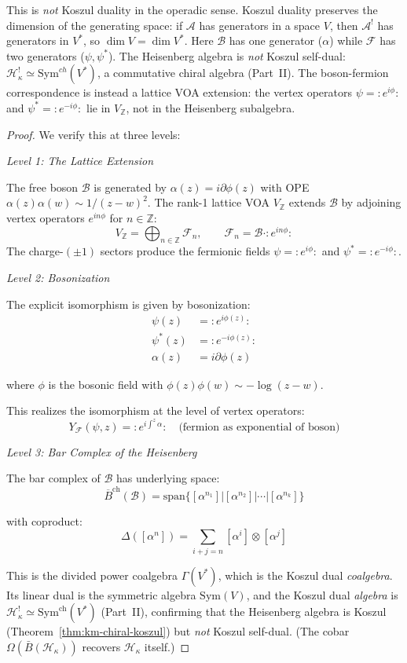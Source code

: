 \begin{remark}
This is \emph{not} Koszul duality in the operadic sense. Koszul duality preserves the dimension of the generating space: if $\mathcal{A}$ has generators in a space $V$, then $\mathcal{A}^!$ has generators in $V^*$, so $\dim V = \dim V^*$. Here $\mathcal{B}$ has one generator ($\alpha$) while $\mathcal{F}$ has two generators ($\psi, \psi^*$). The Heisenberg algebra is \emph{not} Koszul self-dual: $\mathcal{H}_\kappa^! \simeq \mathrm{Sym}^{ch}(V^*)$, a commutative chiral algebra (Part~II). The boson-fermion correspondence is instead a lattice VOA extension: the vertex operators $\psi = {:}e^{i\phi}{:}$ and $\psi^* = {:}e^{-i\phi}{:}$ lie in $V_{\mathbb{Z}}$, not in the Heisenberg subalgebra.
\end{remark}

\begin{proof}
We verify this at three levels:

\emph{Level 1: The Lattice Extension}

The free boson $\mathcal{B}$ is generated by $\alpha(z) = i\partial\phi(z)$ with OPE $\alpha(z)\alpha(w) \sim 1/(z-w)^2$. The rank-1 lattice VOA $V_{\mathbb{Z}}$ extends $\mathcal{B}$ by adjoining vertex operators $e^{in\phi}$ for $n \in \mathbb{Z}$:
\[
V_{\mathbb{Z}} = \bigoplus_{n \in \mathbb{Z}} \mathcal{F}_n, \qquad \mathcal{F}_n = \mathcal{B} \cdot {:}e^{in\phi}{:}
\]
The charge-$(\pm 1)$ sectors produce the fermionic fields $\psi = {:}e^{i\phi}{:}$ and $\psi^* = {:}e^{-i\phi}{:}$.

\emph{Level 2: Bosonization}

The explicit isomorphism is given by bosonization:
\begin{align}
\psi(z) &= :e^{i\phi(z)}: \\
\psi^*(z) &= :e^{-i\phi(z)}: \\
\alpha(z) &= i\partial\phi(z)
\end{align}

where $\phi$ is the bosonic field with $\phi(z)\phi(w) \sim -\log(z-w)$.

This realizes the isomorphism at the level of vertex operators:
\[
Y_{\mathcal{F}}(\psi, z) = :e^{i\int^z \alpha}: \quad \text{(fermion as exponential of boson)}
\]

\emph{Level 3: Bar Complex of the Heisenberg}

The bar complex of $\mathcal{B}$ has underlying space:
\[
\overline{B}^{\text{ch}}(\mathcal{B}) = \text{span}\{[\alpha^{n_1}]|[\alpha^{n_2}]|\cdots|[\alpha^{n_k}]\}
\]

with coproduct:
\[
\Delta([\alpha^n]) = \sum_{i+j=n} [\alpha^i] \otimes [\alpha^j]
\]

This is the divided power coalgebra $\Gamma(V^*)$, which is the Koszul dual \emph{coalgebra}.  Its linear dual is the symmetric algebra $\mathrm{Sym}(V)$, and the Koszul dual \emph{algebra} is $\mathcal{H}_\kappa^! \simeq \mathrm{Sym}^{\mathrm{ch}}(V^*)$ (Part~II), confirming that the Heisenberg algebra is Koszul (Theorem~\ref{thm:km-chiral-koszul}) but \emph{not} Koszul self-dual.  (The cobar $\Omega(\bar{B}(\mathcal{H}_\kappa))$ recovers $\mathcal{H}_\kappa$ itself.)
\end{proof}

